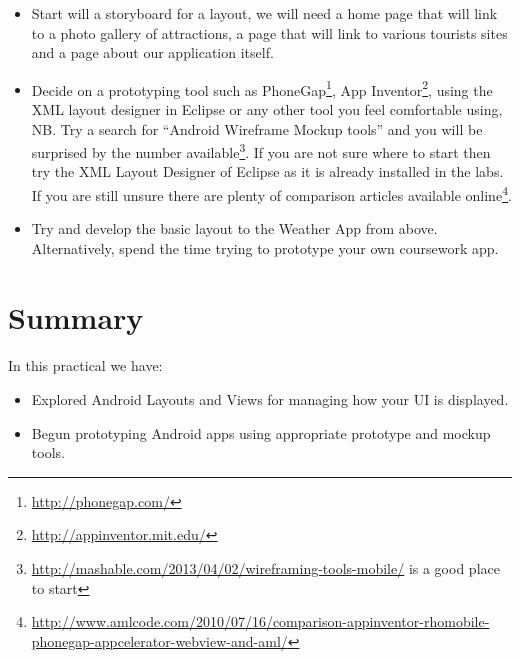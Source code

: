 \documentclass[12pt, a4paper, twoside]{book}
\begin{document}
\begin{itemize}
\item Start will a storyboard for a layout, we will need a home page that will link to a photo gallery of attractions, a page that will link to various tourists sites and a page about our application itself.
\item Decide on a prototyping tool such as PhoneGap\footnote{\url{http://phonegap.com/}}, App Inventor\footnote{\url{http://appinventor.mit.edu/}}, using the XML layout designer in Eclipse or any other tool you feel comfortable using, NB. Try a search for ``Android Wireframe Mockup tools'' and you will be surprised by the number available\footnote{\url{http://mashable.com/2013/04/02/wireframing-tools-mobile/} is a good place to start}. If you are not sure where to start then try the XML Layout Designer of Eclipse as it is already installed in the labs. If you are still unsure there are plenty of comparison articles available online\footnote{\url{http://www.amlcode.com/2010/07/16/comparison-appinventor-rhomobile-phonegap-appcelerator-webview-and-aml/}}.
\item Try and develop the basic layout to the Weather App from above. Alternatively,  spend the time trying to prototype your own coursework app.
\end{itemize}

\section{Summary}
\paragraph{} In this practical we have: 

\begin{itemize}
\item Explored Android Layouts and Views for managing how your UI is displayed.
\item Begun prototyping Android apps using appropriate prototype and mockup tools.
\end{itemize}

\end{document}
